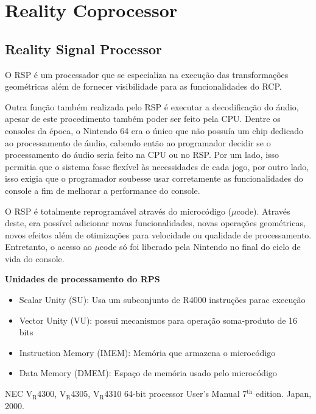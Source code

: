 \documentclass[12pt]{article}
\newcommand{\lowtext}[1]{$_{\text{#1}}$}
\begin{document}
\section{Reality Coprocessor}

\subsection{Reality Signal Processor}

O RSP é um processador que se especializa na execução das transformações
geométricas além de fornecer visibilidade para as funcionalidades do RCP.

Outra função também realizada pelo RSP é executar a decodificação do áudio,
apesar de este procedimento também poder ser feito pela CPU.
Dentre os consoles da época, o Nintendo 64 era o único que não possuía um
chip dedicado ao processamento de áudio, cabendo então ao programador
decidir se o processamento do áudio seria feito na CPU ou no RSP.
Por um lado, isso permitia que o sistema fosse flexível às necessidades de
cada jogo, por outro lado, isso exigia que o programador soubesse usar
corretamente as funcionalidades do console a fim de melhorar a performance
do console.

O RSP é totalmente reprogramável através do microcódigo ($\mu$code). Através
deste, era possível adicionar novas funcionalidades, novas operações
geométricas, novos efeitos além de otimizações para velocidade ou qualidade
de processamento. Entretanto, o acesso ao $\mu$code só foi liberado pela
Nintendo no final do ciclo de vida do console.

\textbf{Unidades de processamento do RPS}

\begin{itemize}
    \item Scalar Unity (SU): Usa um subconjunto de R4000 instruções parac execução
    \item Vector Unity (VU): possui mecanismos para operação soma-produto de 16 bits
    \item Instruction Memory (IMEM): Memória que armazena o microcódigo
    \item Data Memory (DMEM): Espaço de memória usado pelo microcódigo
\end{itemize}



\pagebreak
\begin{thebibliography}{1}
NEC V\lowtext{R}4300, V\lowtext{R}4305, V\lowtext{R}4310 64-bit 
processor User's Manual 7$^{\text{th}}$ edition. Japan, 2000.
\end{thebibliography}
\end{document}
